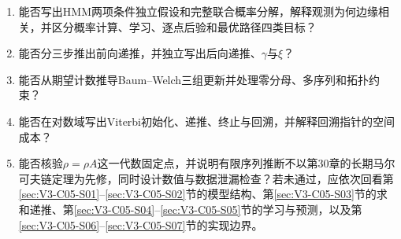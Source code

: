 \begin{SLCompactClosure}
\label{struct:V3-C05-CH36}

\label{struct:V3-C05-CH37}
\begin{selfcheckbox}
\begin{enumerate}[leftmargin=2.2em]
  \item 能否写出HMM两项条件独立假设和完整联合概率分解，解释观测为何边缘相关，并区分概率计算、学习、逐点后验和最优路径四类目标？
  \item 能否分三步推出前向递推，并独立写出后向递推、$\gamma$与$\xi$？
  \item 能否从期望计数推导Baum--Welch三组更新并处理零分母、多序列和拓扑约束？
  \item 能否在对数域写出Viterbi初始化、递推、终止与回溯，并解释回溯指针的空间成本？
  \item 能否核验$\rho=\rho A$这一代数固定点，并说明有限序列推断不以第30章的长期马尔可夫链定理为先修，同时设计数值与数据泄漏检查？若未通过，应依次回看第\ref{sec:V3-C05-S01}--\ref{sec:V3-C05-S02}节的模型结构、第\ref{sec:V3-C05-S03}节的求和递推、第\ref{sec:V3-C05-S04}--\ref{sec:V3-C05-S05}节的学习与预测，以及第\ref{sec:V3-C05-S06}--\ref{sec:V3-C05-S07}节的实现边界。
\end{enumerate}
\end{selfcheckbox}
\end{SLCompactClosure}
\endgroup
